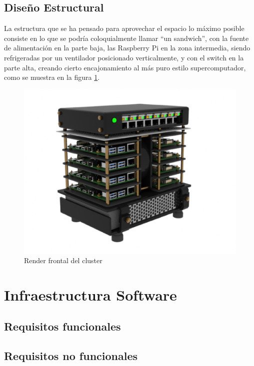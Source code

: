 \subsection{Diseño Estructural}
La estructura que se ha pensado para aprovechar el espacio lo máximo posible consiste en lo que se podría coloquialmente llamar ``un sandwich'', con la fuente de alimentación en la parte baja, las Raspberry Pi en la zona intermedia, siendo refrigeradas por un ventilador posicionado verticalmente, y con el switch en la parte alta, creando cierto encajonamiento al más puro estilo supercomputador, como se muestra en la figura \ref{fig:render_cluster_1}.

\begin{figure}[h!]
  \centering
  \includegraphics[width=\textwidth]{img/render_cluster_1_provisional.png}
  \caption{Render frontal del cluster}
  \label{fig:render_cluster_1}
\end{figure}

\section{Infraestructura Software}
\label{sec:infra_software}

\subsection{Requisitos funcionales}

\subsection{Requisitos no funcionales}
